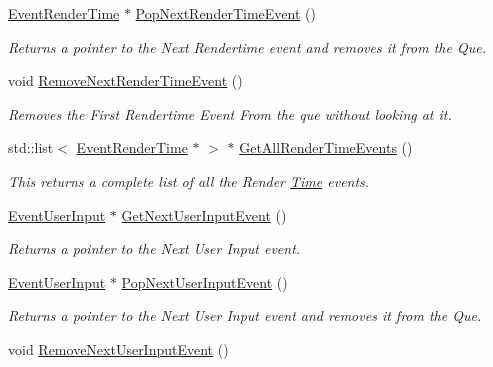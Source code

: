 \begin{DoxyCompactItemize}
\hyperlink{classphys_1_1EventRenderTime}{EventRenderTime} $\ast$ \hyperlink{classphys_1_1EventManager_aa7e800d34ad8b9295ac87dfa822a2a03}{PopNextRenderTimeEvent} ()
\begin{DoxyCompactList}\small\item\em Returns a pointer to the Next Rendertime event and removes it from the Que. \item\end{DoxyCompactList}\item 
void \hyperlink{classphys_1_1EventManager_af1204912be3554312e66d3a777c1f99b}{RemoveNextRenderTimeEvent} ()
\begin{DoxyCompactList}\small\item\em Removes the First Rendertime Event From the que without looking at it. \item\end{DoxyCompactList}\item 
std::list$<$ \hyperlink{classphys_1_1EventRenderTime}{EventRenderTime} $\ast$ $>$ $\ast$ \hyperlink{classphys_1_1EventManager_aee73dff2d113826b8c01db7f7417d527}{GetAllRenderTimeEvents} ()
\begin{DoxyCompactList}\small\item\em This returns a complete list of all the Render \hyperlink{structphys_1_1Time}{Time} events. \item\end{DoxyCompactList}\item 
\hyperlink{classphys_1_1EventUserInput}{EventUserInput} $\ast$ \hyperlink{classphys_1_1EventManager_a38b42602a3a4d621048c78b525b4db49}{GetNextUserInputEvent} ()
\begin{DoxyCompactList}\small\item\em Returns a pointer to the Next User Input event. \item\end{DoxyCompactList}\item 
\hyperlink{classphys_1_1EventUserInput}{EventUserInput} $\ast$ \hyperlink{classphys_1_1EventManager_afa89317d4b16c2b7065b9f79a4354654}{PopNextUserInputEvent} ()
\begin{DoxyCompactList}\small\item\em Returns a pointer to the Next User Input event and removes it from the Que. \item\end{DoxyCompactList}\item 
void \hyperlink{classphys_1_1EventManager_add41b5f4d2942461bcaf40a97ad40b09}{RemoveNextUserInputEvent} ()

\end{DoxyCompactItemize}
